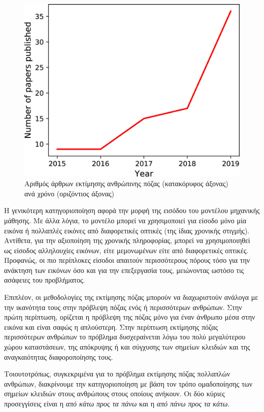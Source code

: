 \begin{figure}[h]
    \centering
    \includegraphics[scale=1.5]{images/chapter2/3d_pose_estimation/pose_estimation_papers_per_year.jpg}
    \caption[Άρθρα εκτίμησης πόζας ανά χρόνο]{Αριθμός άρθρων εκτίμησης ανθρώπινης πόζας (κατακόρυφος άξονας) ανά χρόνο (οριζόντιος άξονας)}
    \label{fig:pose_estimation_papers}
\end{figure}

Η γενικότερη κατηγοριοποίηση αφορά την μορφή της εισόδου του μοντέλου μηχανικής μάθησης. Με άλλα λόγια, το μοντέλο μπορεί να χρησιμοποιεί για είσοδο μόνο μία εικόνα ή πολλαπλές εικόνες από διαφορετικές οπτικές (της ίδιας χρονικής στιγμής). Αντίθετα, για την αξιοποίηση της χρονικής πληροφορίας, μπορεί να χρησιμοποιηθεί ως είσοδος αλληλουχίες εικόνων, είτε μεμονωμένων είτε από διαφορετικές οπτικές. Προφανώς, οι πιο περίπλοκες είσοδοι απαιτούν περισσότερους πόρους τόσο για την ανάκτηση των εικόνων όσο και για την επεξεργασία τους, μειώνοντας ωστόσο τις ασάφειες του προβλήματος.

Επιπλέον, οι μεθοδολογίες της εκτίμησης πόζας μπορούν να διαχωριστούν ανάλογα με την ικανότητα τους στην πρόβλεψη πόζας ενός ή περισσότερων ανθρώπων. Στην πρώτη περίπτωση, ορίζεται η πρόβλεψη της πόζας μόνο για έναν άνθρωπο μέσα στην εικόνα και είναι σαφώς η απλούστερη. Στην περίπτωση εκτίμησης πόζας περισσότερων ανθρώπων το πρόβλημα δυσχεραίνεται λόγω του πολύ μεγαλύτερου χώρου καταστάσεων, της απόκρυψης ή και σύγχυσης των σημείων κλειδιών και της αναγκαιότητας διαφοροποίησης τους.

Τοιουτοτρόπως, συγκεκριμένα για το πρόβλημα εκτίμησης πόζας πολλαπλών ανθρώπων, διακρίνουμε την κατηγοριοποίηση με βάση τον τρόπο ομαδοποίησης των σημείων κλειδιών στους ανθρώπους στους οποίους ανήκουν. Οι δύο κύριες προσεγγίσεις είναι η \textsl{από κάτω προς τα πάνω} και η \textsl{από πάνω προς τα κάτω}.

